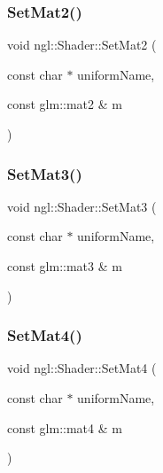 \subsubsection{\texorpdfstring{Set\+Mat2()}{SetMat2()}}
{\footnotesize\ttfamily void ngl\+::\+Shader\+::\+Set\+Mat2 (\begin{DoxyParamCaption}\item[{const char $\ast$}]{uniform\+Name,  }\item[{const glm\+::mat2 \&}]{m }\end{DoxyParamCaption})}

\mbox{\label{classngl_1_1_shader_aa13fb95be36a83e444757388d54dfcf4}} 
\subsubsection{\texorpdfstring{Set\+Mat3()}{SetMat3()}}
{\footnotesize\ttfamily void ngl\+::\+Shader\+::\+Set\+Mat3 (\begin{DoxyParamCaption}\item[{const char $\ast$}]{uniform\+Name,  }\item[{const glm\+::mat3 \&}]{m }\end{DoxyParamCaption})}

\mbox{\label{classngl_1_1_shader_ab3c107f382db01c40318aa57f0ae1e9f}} 
\subsubsection{\texorpdfstring{Set\+Mat4()}{SetMat4()}}
{\footnotesize\ttfamily void ngl\+::\+Shader\+::\+Set\+Mat4 (\begin{DoxyParamCaption}\item[{const char $\ast$}]{uniform\+Name,  }\item[{const glm\+::mat4 \&}]{m }\end{DoxyParamCaption})}

\mbox{\label{classngl_1_1_shader_ac1655947f926eb8e0e747c769ae90844}} 
